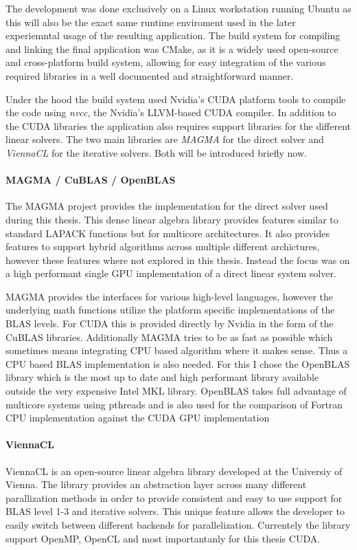 \documentclass[a4paper,11pt]{kth-mag}
\begin{document}
The development was done exclusively on a Linux workstation running Ubuntu as this will also be the exact same runtime enviroment used in the later experiemntal usage of the resulting application. The build system for compiling and linking the final application was CMake, as it is a widely used open-source and cross-platform build system, allowing for easy integration of the various required libraries in a well documented and straightforward manner.

Under the hood the build system used Nvidia's CUDA platform tools to compile the code using \emph{nvcc}, the Nvidia's LLVM-based CUDA compiler. In addition to the CUDA libraries the application also requires support libraries for the different linear solvers. The two main libraries are \emph{MAGMA} for the direct solver and \emph{ViennaCL} for the iterative solvers. Both will be introduced briefly now.

\paragraph{MAGMA / CuBLAS / OpenBLAS}
The MAGMA project provides the implementation for the direct solver used during this thesis. This dense linear algebra library provides features similar to standard LAPACK functions but for multicore architectures. It also provides features to support hybrid algorithms across multiple different archictures, however these features where not explored in this thesis. Instead the focus was on a high performant single GPU implementation of a direct linear system solver.

MAGMA provides the interfaces for various high-level languages, however the underlying math functions utilize the platform specific implementations of the BLAS levels. For CUDA this is provided directly by Nvidia in the form of the CuBLAS libraries. Additionally MAGMA tries to be as fast as possible which sometimes means integrating CPU based algorithm where it makes sense. Thus a CPU based BLAS implementation is also needed. For this I chose the OpenBLAS library which is the most up to date and high performant library available outside the very expensive Intel MKL library. OpenBLAS takes full advantage of multicore systems using pthreads and is also used for the comparison of Fortran CPU implementation against the CUDA GPU implementation

\paragraph{ViennaCL}
ViennaCL is an open-source linear algebra library developed at the Universiy of Vienna. The library provides an abstraction layer across many different parallization methods in order to provide consistent and easy to use support for BLAS level 1-3 and iterative solvers. This unique feature allows the developer to easily switch between different backends for parallelization. Currentely the library support OpenMP, OpenCL and most importantanly for this thesis CUDA.
\end{document}
